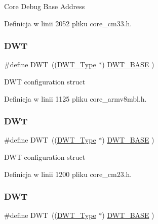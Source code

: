 Core Debug Base Address 

Definicja w linii 2052 pliku core\+\_\+cm33.\+h.

\mbox{\label{group___c_m_s_i_s__core__base_gabbe5a060185e1d5afa3f85b14e10a6ce}} 
\subsubsection{\texorpdfstring{D\+WT}{DWT}\hspace{0.1cm}{\footnotesize\ttfamily [1/8]}}
{\footnotesize\ttfamily \#define D\+WT~((\hyperlink{struct_d_w_t___type}{D\+W\+T\+\_\+\+Type}       $\ast$)     \hyperlink{group___c_m_s_i_s__core__base_gafdab534f961bf8935eb456cb7700dcd2}{D\+W\+T\+\_\+\+B\+A\+SE}         )}

D\+WT configuration struct 

Definicja w linii 1125 pliku core\+\_\+armv8mbl.\+h.

\mbox{\label{group___c_m_s_i_s__core__base_gabbe5a060185e1d5afa3f85b14e10a6ce}} 
\subsubsection{\texorpdfstring{D\+WT}{DWT}\hspace{0.1cm}{\footnotesize\ttfamily [2/8]}}
{\footnotesize\ttfamily \#define D\+WT~((\hyperlink{struct_d_w_t___type}{D\+W\+T\+\_\+\+Type}       $\ast$)     \hyperlink{group___c_m_s_i_s__core__base_gafdab534f961bf8935eb456cb7700dcd2}{D\+W\+T\+\_\+\+B\+A\+SE}         )}

D\+WT configuration struct 

Definicja w linii 1200 pliku core\+\_\+cm23.\+h.

\mbox{\label{group___c_m_s_i_s__core__base_gabbe5a060185e1d5afa3f85b14e10a6ce}} 
\subsubsection{\texorpdfstring{D\+WT}{DWT}\hspace{0.1cm}{\footnotesize\ttfamily [3/8]}}
{\footnotesize\ttfamily \#define D\+WT~((\hyperlink{struct_d_w_t___type}{D\+W\+T\+\_\+\+Type}       $\ast$)     \hyperlink{group___c_m_s_i_s__core__base_gafdab534f961bf8935eb456cb7700dcd2}{D\+W\+T\+\_\+\+B\+A\+SE}      )}

